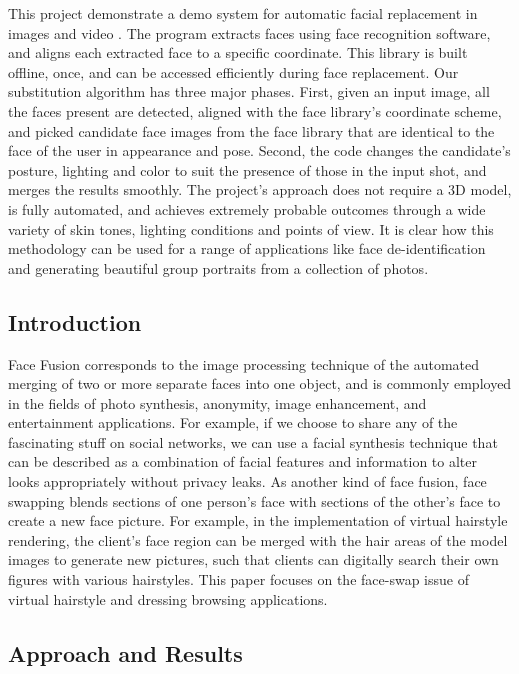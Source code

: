 \documentclass[12pt, a4paper, twocolumn]{article}
\begin{document}
This project demonstrate a demo system for automatic facial replacement
in images and video . The program extracts faces using face recognition
software, and aligns each extracted face to a specific coordinate. This
library is built offline, once, and can be accessed efficiently during
face replacement. Our substitution algorithm has three major phases.
First, given an input image, all the faces present are detected, aligned
with the face library's coordinate scheme, and picked candidate face
images from the face library that are identical to the face of the user
in appearance and pose. Second, the code changes the candidate's
posture, lighting and color to suit the presence of those in the input
shot, and merges the results smoothly. The project's approach does not
require a 3D model, is fully automated, and achieves extremely probable
outcomes through a wide variety of skin tones, lighting conditions and
points of view. It is clear how this methodology can be used for a range
of applications like face de-identification and generating beautiful
group portraits from a collection of photos.

\subsection{Introduction}\label{header-n413}

Face Fusion corresponds to the image processing technique of the
automated merging of two or more separate faces into one object, and is
commonly employed in the fields of photo synthesis, anonymity, image
enhancement, and entertainment applications. For example, if we choose
to share any of the fascinating stuff on social networks, we can use a
facial synthesis technique that can be described as a combination of
facial features and information to alter looks appropriately without
privacy leaks. As another kind of face fusion, face swapping blends
sections of one person's face with sections of the other's face to
create a new face picture. For example, in the implementation of virtual
hairstyle rendering, the client's face region can be merged with the
hair areas of the model images to generate new pictures, such that
clients can digitally search their own figures with various hairstyles.
This paper focuses on the face-swap issue of virtual hairstyle and
dressing browsing applications.

\subsection{Approach and Results}\label{header-n393}
\end{document}

